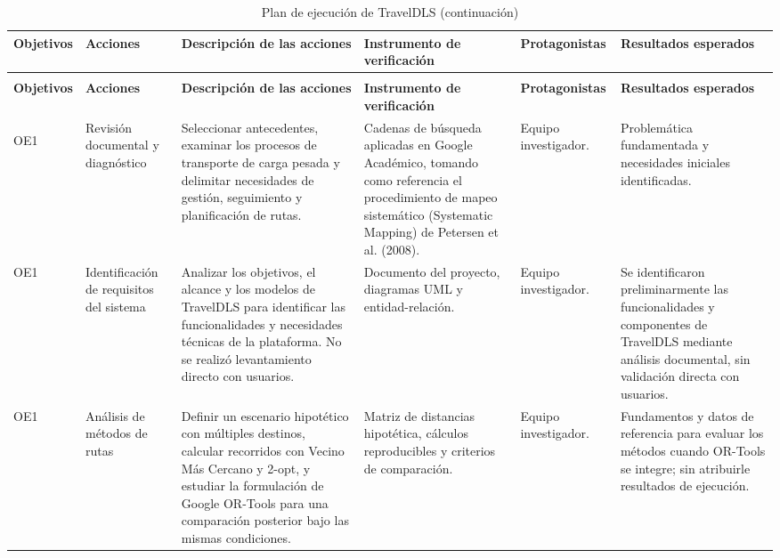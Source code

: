 	\begingroup
	\scriptsize
	\setlength{\tabcolsep}{2pt}
	\renewcommand{\arraystretch}{1.15}
	\begin{longtable}{@{}>{\RaggedRight\arraybackslash}p{1.5cm}>{\RaggedRight\arraybackslash}p{2.3cm}>{\RaggedRight\arraybackslash}p{3.75cm}>{\RaggedRight\arraybackslash}p{2.9cm}>{\RaggedRight\arraybackslash}p{2.1cm}>{\RaggedRight\arraybackslash}p{2.85cm}@{}}
	\caption{Plan de ejecución de TravelDLS}\label{tab:plan_ejecucion}\\
	\toprule
	\textbf{Objetivos} & \textbf{Acciones} & \textbf{Descripción de las acciones} & \textbf{Instrumento de verificación} & \textbf{Protagonistas} & \textbf{Resultados esperados} \\
	\midrule
	\endfirsthead
	\caption[]{Plan de ejecución de TravelDLS (continuación)}\\
	\toprule
	\textbf{Objetivos} & \textbf{Acciones} & \textbf{Descripción de las acciones} & \textbf{Instrumento de verificación} & \textbf{Protagonistas} & \textbf{Resultados esperados} \\
	\midrule
	\endhead
	\endfoot
	\bottomrule
	\endlastfoot
	\hypertarget{plan-oe1}{OE1} & Revisión documental y diagnóstico & Seleccionar antecedentes, examinar los procesos de transporte de carga pesada y delimitar necesidades de gestión, seguimiento y planificación de rutas. & Cadenas de búsqueda aplicadas en Google Académico, tomando como referencia el procedimiento de mapeo sistemático (Systematic Mapping) de Petersen et al. (2008). & Equipo investigador. & Problemática fundamentada y necesidades iniciales identificadas. \\ \midrule
	OE1 & Identificación de requisitos del sistema & Analizar los objetivos, el alcance y los modelos de TravelDLS para identificar las funcionalidades y necesidades técnicas de la plataforma. No se realizó levantamiento directo con usuarios. & Documento del proyecto, diagramas UML y entidad-relación. & Equipo investigador. & Se identificaron preliminarmente las funcionalidades y componentes de TravelDLS mediante análisis documental, sin validación directa con usuarios. \\ \midrule
	OE1 & Análisis de métodos de rutas & Definir un escenario hipotético con múltiples destinos, calcular recorridos con Vecino Más Cercano y 2-opt, y estudiar la formulación de Google OR-Tools para una comparación posterior bajo las mismas condiciones. & Matriz de distancias hipotética, cálculos reproducibles y criterios de comparación. & Equipo investigador. & Fundamentos y datos de referencia para evaluar los métodos cuando OR-Tools se integre; sin atribuirle resultados de ejecución. \\ \midrule

\end{longtable}
